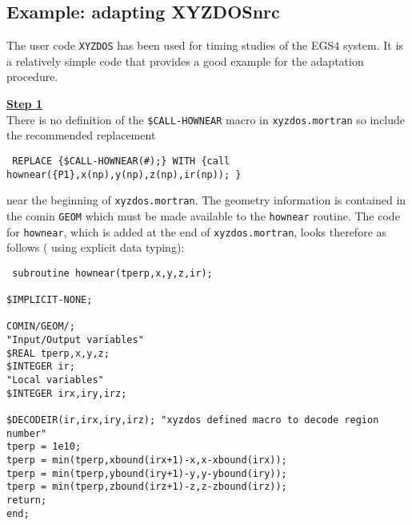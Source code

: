\subsection{Example: adapting XYZDOSnrc}
\label{adapt_xyzdos}

The user code {\tt XYZDOS} has been used for timing studies of the
EGS4 system\cite{BR92}. It is a relatively simple code that 
provides a good example for the adaptation procedure.


\noindent
\underline{\bf Step 1} \hfill \\
There is no definition of the {\tt \$CALL-HOWNEAR} macro 
in {\tt xyzdos.mortran} so include the recommended replacement 
\begin{flushleft} {\tt
REPLACE \{\$CALL-HOWNEAR(\#);\} WITH 
\{call hownear(\{P1\},x(np),y(np),z(np),ir(np)); \}
\\ } 
\end{flushleft}
near the beginning of {\tt xyzdos.mortran}. 
The geometry information is contained in 
the comin {\tt GEOM} which must be made available 
to the {\tt hownear} routine. The code 
for {\tt hownear}, which is added at the end of {\tt xyzdos.mortran}, 
looks therefore as follows ( using explicit data typing): 
\begin{flushleft} {\tt
subroutine hownear(tperp,x,y,z,ir);\\
~\\
\$IMPLICIT-NONE;\\
~\\
COMIN/GEOM/;\\
"Input/Output variables"\\
\$REAL tperp,x,y,z;\\
\$INTEGER ir;\\
"Local variables"\\
\$INTEGER irx,iry,irz;\\
~\\
\$DECODEIR(ir,irx,iry,irz); "xyzdos defined macro to decode region number"\\
tperp = 1e10;\\
tperp = min(tperp,xbound(irx+1)-x,x-xbound(irx));\\
tperp = min(tperp,ybound(iry+1)-y,y-ybound(iry));\\
tperp = min(tperp,zbound(irz+1)-z,z-zbound(irz));\\
return;\\
end;\\
}
\end{flushleft}


